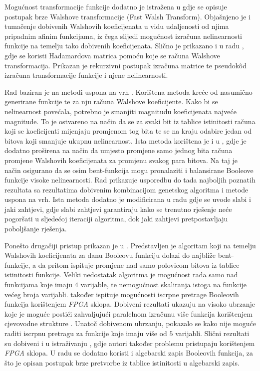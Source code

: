 Mogućnost transformacije funkcije dodatno je istražena u \cite{MeasuringBoolean} gdje se opisuje postupak brze Walshove transformacije \engl(Fast Walsh Transform).
Objašnjeno je i tumačenje dobivenih Walshovih koeficijenata u vidu udaljenosti od njima pripadnim afinim funkcijama, iz čega slijedi mogućnost izračuna nelinearnosti funkcije na temelju tako dobivenih koeficijenata.
Slično je prikazano i u radu \cite{CalculatingNonlinearity}, gdje se koristi Hadamardova matrica pomoću koje se računa Walshove transformacija.
Prikazan je rekurzivni postupak izračuna matrice te pseudok\^{o}d izračuna transformacije funkcije i njene nelinearnosti.

Rad \cite{millan1997smart} baziran je na metodi uspona na vrh .
Korištena metoda kreće od nasumično generirane funkcije te za nju računa Walshove koeficijente.
Kako bi se nelinearnost povećala, potrebno je smanjiti magnitudu koeficijenata najveće magnitude.
To je ostvareno na način da se za svaki bit iz tablice istinitosti računa koji se koeficijenti mijenjaju promjenom tog bita te se na kraju odabire jedan od bitova koji smanjuje ukupnu nelinearnost.
Ista metoda korištena je i u \cite{millan1997effective}, gdje je dodatno proširena na način da umjesto promjene samo jednog bita računa promjene Walshovih koeficijenata za promjenu svakog para bitova.
Na taj je način osigurano da se osim bent-funkcija mogu pronalaziti i balansirane Booleove funkcije visoke nelinearnosti.
Rad \cite{millan1998heuristic} prikazuje usporedbu do tada najboljih poznatih rezultata sa rezultatima dobivenim kombinacijom genetskog algoritma i metode uspona na vrh.
Ista metoda dodatno je modificirana u radu \cite{millan1999boolean} gdje se uvode slabi  i jaki  zahtjevi, gdje slabi zahtjevi garantiraju kako se trenutno rješenje neće pogoršati u sljedećoj iteraciji algoritma, dok jaki zahtjevi pretpostavljaju poboljšanje rješenja.

Ponešto drugačiji pristup prikazan je u \cite{DiscoveryOfBent}.
Predstavljen je algoritam koji na temelju Walshovih koeficijenata za danu Booleovu funkciju dolazi do najbliže bent-funkcije, a da pritom ispituje promjene nad samo polovicom bitova iz tablice istinitosti funkcije.
Veliki nedostatak algoritma je mogućnost rada samo nad funkcijama koje imaju $4$ varijable, te nemogućnost skaliranja istoga na funkcije većeg broja varijabli.
\cite{DiscoveryOfBent} također ispituje mogućnosti iscrpne pretrage Booleovih funkcija korištenjem \textit{FPGA} sklopa.
Dobiveni rezultati ukazuju na visoko ubrzanje koje je moguće postići zahvaljujući paralelnom izračunu više funkcija korištenjem cjevovodne strukture .
Unatoč dobivenom ubrzanju, pokazalo se kako nije moguće raditi iscrpnu pretragu za funkcije koje imaju više od $5$ varijabli.
Slični rezultati su dobiveni i u istraživanju \cite{EnumerationOfBentBoolean}, gdje autori također problemu pristupaju korištenjem \textit{FPGA} sklopa.
U radu se dodatno koristi i algebarski zapis Booleovih funkcija, za što je opisan postupak brze pretvorbe iz tablice istinitosti u algebarski zapis.

